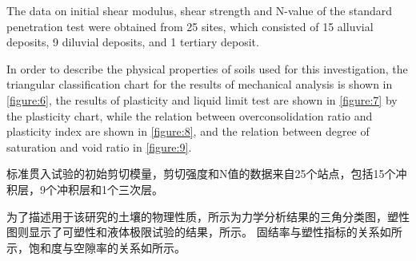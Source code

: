 


\begin{paracol}{2}
    
    The data on initial shear modulus, shear strength and N-value of the standard penetration test were obtained from 25 sites, which consisted of 15 alluvial deposits, 9 diluvial deposits, and 1 tertiary deposit.

    In order to describe the physical properties of soils used for this investigation, the triangular classification chart for the results of mechanical analysis is shown in \autoref{figure:6}, the results of plasticity and liquid limit test are shown in \autoref{figure:7} by the plasticity chart, while the relation between overconsolidation ratio and plasticity index are shown in \autoref{figure:8}, and the relation between degree of saturation and void ratio in \autoref{figure:9}.

    \switchcolumn

    标准贯入试验的初始剪切模量，剪切强度和N值的数据来自25个站点，包括15个冲积层，9个冲积层和1个三次层。
   
    为了描述用于该研究的土壤的物理性质，所示为力学分析结果的三角分类图，塑性图则显示了可塑性和液体极限试验的结果，所示。 固结率与塑性指标的关系如所示，饱和度与空隙率的关系如所示。

\end{paracol}



